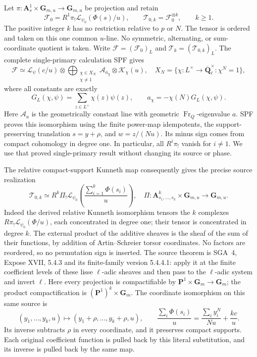 Let \(\pi:\mathbf A^1_s\times\mathbf G_{m,u}\to\mathbf
G_{m,u}\) be projection and retain
\[
 \mathcal F_0=R^1\pi_!\mathcal L_{\psi_0}(\Phi(s)/u),\qquad
 \mathcal T_{0,k}=\mathcal F_0^{\otimes k},\qquad k\ge1.
 \tag{TPF.3}\label{eq:TPF3}
\]
The positive integer \(k\) has no restriction relative to
\(p\) or \(N\). The tensor is ordered and taken on this
one common \(u\)-line. No symmetric, alternating, or
sum-coordinate quotient is taken. Write
\(\mathcal F=(\mathcal F_0)_L\) and
\(\mathcal T_k=(\mathcal T_{0,k})_L\).
The complete single-primary calculation SPF gives
\[
 \mathcal F\simeq
 \mathcal L_\psi(c/u)\otimes
 \bigoplus_{\substack{\chi\in X_N\\\chi\ne1}}
        \mathcal A_{a_\chi}\otimes\mathcal K_\chi(u),
 \quad
 X_N=\{\chi:L^\times\to\overline{\mathbf Q}_\ell^\times:
                      \chi^N=1\},
 \tag{TPF.4}\label{eq:TPF4}
\]
where all constants are exactly
\[
 G_L(\chi,\psi)=\sum_{z\in L^\times}\chi(z)\psi(z),
 \qquad
 a_\chi=-\chi(N)G_L(\chi,\psi).
 \tag{TPF.5}\label{eq:TPF5}
\]
Here \(\mathcal A_a\) is the geometrically constant line
with geometric \(\operatorname{Fr}_Q\)-eigenvalue \(a\).
SPF proves this isomorphism using the finite power-map
idempotents, the support-preserving translation
\(s=y+\rho\), and \(w=z/(Nu)\). Its minus sign comes from
compact cohomology in degree one. In particular, all
\(R^i\pi_!\) vanish for \(i\ne1\). We use that proved
single-primary result without changing its source or phase.

The relative compact-support Kunneth map consequently gives
the precise source realization
\[
 \mathcal T_{0,k}\simeq
 R^k\Pi_!\mathcal L_{\psi_0}
       \left(\frac{\sum_{i=1}^k\Phi(s_i)}u\right),
 \quad
 \Pi:\mathbf A^k_{s_1,\ldots,s_k}\times\mathbf G_{m,u}
          \longrightarrow\mathbf G_{m,u}.
 \tag{TPF.6}\label{eq:TPF6}
\]
Indeed the derived relative Kunneth isomorphism tensors the
\(k\) complexes \(R\pi_!\mathcal L_{\psi_0}(\Phi/u)\),
each concentrated in degree one; their tensor is
concentrated in degree \(k\). The external product of the
additive sheaves is the sheaf of the sum of their functions,
by addition of Artin--Schreier torsor coordinates. No
factors are reordered, so no permutation sign is inserted.
The source theorem is SGA~4, Expose XVII, 5.4.3
and its finite-family version 5.4.4.1: apply it
at the finite coefficient levels of these
lisse \(\ell\)-adic sheaves and then pass to
the \(\ell\)-adic system and invert \(\ell\).
Here every projection is compactifiable by
\(\mathbf P^1\times\mathbf G_m\to\mathbf G_m\);
the product compactification is
\((\mathbf P^1)^k\times\mathbf G_m\).
The coordinate isomorphism on this same source is
\[
 (y_1,\ldots,y_k,u)\longmapsto
       (y_1+\rho,\ldots,y_k+\rho,u),\qquad
 \frac{\sum_i\Phi(s_i)}u
       =\frac{\sum_i y_i^N}{Nu}+\frac{kc}{u}.
 \tag{TPF.7}\label{eq:TPF7}
\]
Its inverse subtracts \(\rho\) in every coordinate, and it
preserves compact supports. Each original coefficient
function is pulled back by this literal substitution,
and its inverse is pulled back by the same map.

